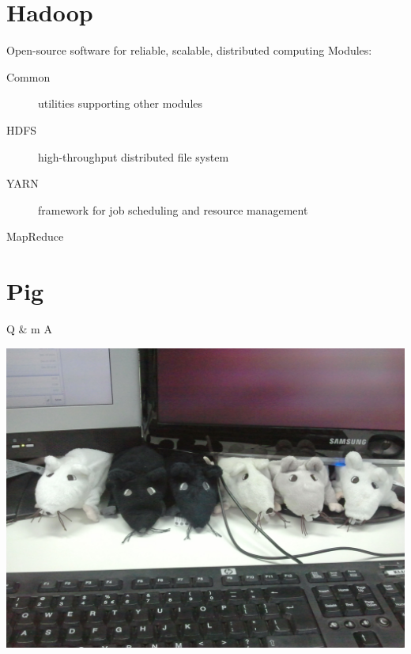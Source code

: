 \documentclass{beamer}
\begin{document}
\section{Hadoop}

\begin{frame}
    \begin{block}{Open-source software for reliable, scalable, distributed computing}
        Modules:
        \begin{description}
            \item[Common] utilities supporting other modules
            \item[HDFS] high-throughput distributed file system
            \item[YARN] framework for job scheduling and resource management
            \item[MapReduce] 
        \end{description}
    \end{block}
\end{frame}


\section{Pig}



\begin{frame}
\begin{center}
\Huge{Q \& m A}

\includegraphics[scale=0.1]{../common/questions.jpg} 

\end{center}

\end{frame}
\end{document}
